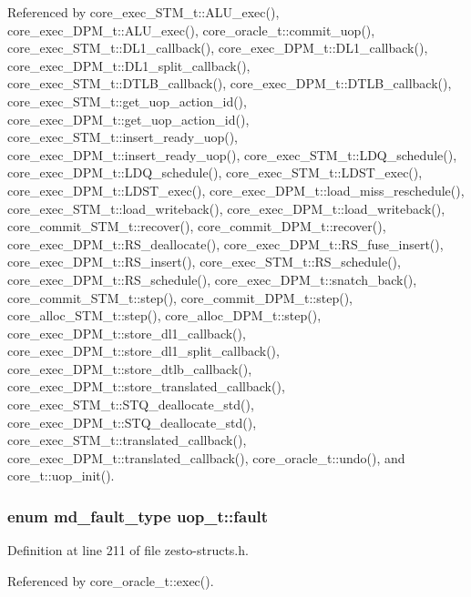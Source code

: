 Referenced by core\_\-exec\_\-STM\_\-t::ALU\_\-exec(), core\_\-exec\_\-DPM\_\-t::ALU\_\-exec(), core\_\-oracle\_\-t::commit\_\-uop(), core\_\-exec\_\-STM\_\-t::DL1\_\-callback(), core\_\-exec\_\-DPM\_\-t::DL1\_\-callback(), core\_\-exec\_\-DPM\_\-t::DL1\_\-split\_\-callback(), core\_\-exec\_\-STM\_\-t::DTLB\_\-callback(), core\_\-exec\_\-DPM\_\-t::DTLB\_\-callback(), core\_\-exec\_\-STM\_\-t::get\_\-uop\_\-action\_\-id(), core\_\-exec\_\-DPM\_\-t::get\_\-uop\_\-action\_\-id(), core\_\-exec\_\-STM\_\-t::insert\_\-ready\_\-uop(), core\_\-exec\_\-DPM\_\-t::insert\_\-ready\_\-uop(), core\_\-exec\_\-STM\_\-t::LDQ\_\-schedule(), core\_\-exec\_\-DPM\_\-t::LDQ\_\-schedule(), core\_\-exec\_\-STM\_\-t::LDST\_\-exec(), core\_\-exec\_\-DPM\_\-t::LDST\_\-exec(), core\_\-exec\_\-DPM\_\-t::load\_\-miss\_\-reschedule(), core\_\-exec\_\-STM\_\-t::load\_\-writeback(), core\_\-exec\_\-DPM\_\-t::load\_\-writeback(), core\_\-commit\_\-STM\_\-t::recover(), core\_\-commit\_\-DPM\_\-t::recover(), core\_\-exec\_\-DPM\_\-t::RS\_\-deallocate(), core\_\-exec\_\-DPM\_\-t::RS\_\-fuse\_\-insert(), core\_\-exec\_\-DPM\_\-t::RS\_\-insert(), core\_\-exec\_\-STM\_\-t::RS\_\-schedule(), core\_\-exec\_\-DPM\_\-t::RS\_\-schedule(), core\_\-exec\_\-DPM\_\-t::snatch\_\-back(), core\_\-commit\_\-STM\_\-t::step(), core\_\-commit\_\-DPM\_\-t::step(), core\_\-alloc\_\-STM\_\-t::step(), core\_\-alloc\_\-DPM\_\-t::step(), core\_\-exec\_\-DPM\_\-t::store\_\-dl1\_\-callback(), core\_\-exec\_\-DPM\_\-t::store\_\-dl1\_\-split\_\-callback(), core\_\-exec\_\-DPM\_\-t::store\_\-dtlb\_\-callback(), core\_\-exec\_\-DPM\_\-t::store\_\-translated\_\-callback(), core\_\-exec\_\-STM\_\-t::STQ\_\-deallocate\_\-std(), core\_\-exec\_\-DPM\_\-t::STQ\_\-deallocate\_\-std(), core\_\-exec\_\-STM\_\-t::translated\_\-callback(), core\_\-exec\_\-DPM\_\-t::translated\_\-callback(), core\_\-oracle\_\-t::undo(), and core\_\-t::uop\_\-init().
\subsubsection[{fault}]{\setlength{\rightskip}{0pt plus 5cm}enum {\bf md\_\-fault\_\-type} {\bf uop\_\-t::fault}}\label{structuop__t_3c07aa650f5f60bee4eb64e9f8230bf0}




Definition at line 211 of file zesto-structs.h.

Referenced by core\_\-oracle\_\-t::exec().
